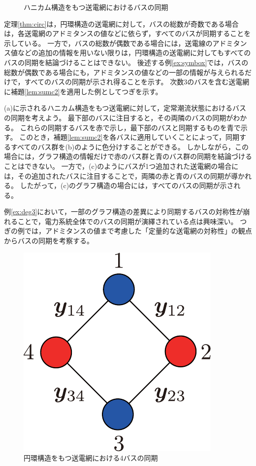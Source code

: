\documentclass[tombow,dvipdfmx]{corona-a5-1.1}
\begin{document}
\begin{figure}[t]
{\begin{minipage}{0.3\linewidth}
    \subcaption{  }
  \end{minipage}
  \caption{ハニカム構造をもつ送電網におけるバスの同期}
  \label{fig:hony}
  }
\end{figure}

定理\ref{thm:circ}は，円環構造の送電網に対して，バスの総数が奇数である場合は，各送電網のアドミタンスの値などに依らず，すべてのバスが同期することを示している。
一方で，バスの総数が偶数である場合には，送電線のアドミタンス値などの追加の情報を用いない限りは，円環構造の送電網に対してもすべてのバスの同期を結論づけることはできない。
後述する例\ref{ex:symbox}では，バスの総数が偶数である場合にも，アドミタンスの値などの一部の情報が与えられるだけで，すべてのバスの同期が示され得ることを示す。
次数3のバスを含む送電網に補題\ref{lem:sumc2}を適用した例としてつぎを示す。

\begin{例}[ハニカム構造の送電網におけるバスの同期]\label{ex:deg3}
(a)に示されるハニカム構造をもつ送電網に対して，定常潮流状態におけるバスの同期を考えよう。
最下部のバスに注目すると，その両隣のバスの同期がわかる。
これらの同期するバスを赤で示し，最下部のバスと同期するものを青で示す。
このとき，補題\ref{lem:sumc2}を各バスに適用していくことによって，同期するすべてのバス群を(b)のように色分けすることができる。
しかしながら，この場合には，グラフ構造の情報だけで赤のバス群と青のバス群の同期を結論づけることはできない。
一方で，(c)のようにバスが1つ追加された送電網の場合には，その追加されたバスに注目することで，両隣の赤と青のバスの同期が導かれる。
したがって，(c)のグラフ構造の場合には，すべてのバスの同期が示される。
\end{例}

例\ref{ex:deg3}において，一部のグラフ構造の差異により同期するバスの対称性が崩れることで，電力系統全体でのバスの同期が演繹されている点は興味深い。
つぎの例では，アドミタンスの値まで考慮した「定量的な送電網の対称性」の観点からバスの同期を考察する。

\begin{figure}[t]
\centering
\includegraphics[width = .18\linewidth]{figs/4busbox}
\caption{円環構造をもつ送電網における4バスの同期}
\label{fig:4busbox}
\end{figure}
\end{document}
